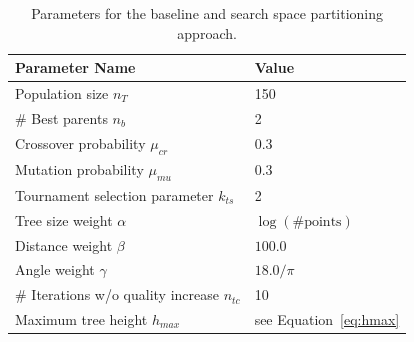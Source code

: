 \begin{table}[h]
	\centering
	\begin{tabular}{|l|l|}
		\hline
		\textbf{Parameter Name} & \textbf{Value}  \\
		\hline
		Population size $n_T$ & 150 \\
		\hline
		\# Best parents $n_b$ & 2 \\
		\hline
		Crossover probability $\mu_{cr}$& 0.3 \\
		\hline
		Mutation probability $\mu_{mu}$& 0.3 \\
		\hline
		Tournament selection parameter $k_{ts}$ & 2\\
		\hline
		Tree size weight $\alpha$& $\log(\text{\#points})$\\
		\hline
		Distance weight $\beta$& $100.0$ \\
		\hline
		Angle weight $\gamma$& $18.0/\pi$ \\
		\hline 
		\# Iterations w/o quality increase $n_{tc}$ & 10 \\
		\hline 
		Maximum tree height $h_{max}$ & see Equation~\ref{eq:hmax} \\
		\hline 
	\end{tabular}
	\caption{Parameters for the baseline and search space partitioning approach.}
	\label{tab:gaparams}
\end{table}   
